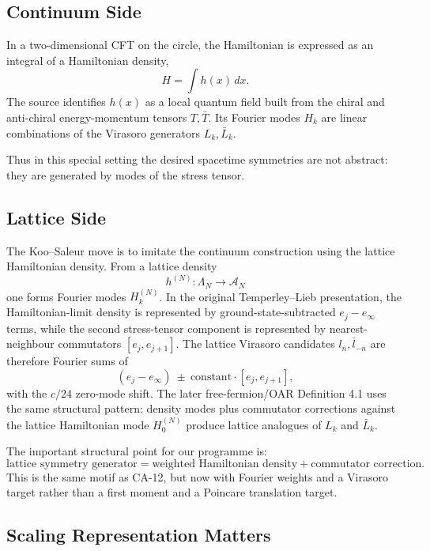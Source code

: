 \subsection{Continuum Side}

In a two-dimensional CFT on the circle, the Hamiltonian is expressed as an
integral of a Hamiltonian density,
\[
  H=\int h(x)\,dx.
\]
The source identifies \(h(x)\) as a local quantum field built from the chiral and
anti-chiral energy-momentum tensors \(T,\bar T\).  Its Fourier modes \(H_k\)
are linear combinations of the Virasoro generators \(L_k,\bar L_k\).

Thus in this special setting the desired spacetime symmetries are not abstract:
they are generated by modes of the stress tensor.

\subsection{Lattice Side}

The Koo--Saleur move is to imitate the continuum construction using the lattice
Hamiltonian density.  From a lattice density
\[
  h^{(N)}:\Lambda_N\to \mathcal A_N
\]
one forms Fourier modes \(H_k^{(N)}\).  In the original Temperley--Lieb
presentation, the Hamiltonian-limit density is represented by
ground-state-subtracted \(e_j-e_\infty\) terms, while the second stress-tensor
component is represented by nearest-neighbour commutators
\([e_j,e_{j+1}]\).  The lattice Virasoro candidates \(l_n,\bar l_{-n}\) are
therefore Fourier sums of
\[
  (e_j-e_\infty)\ \pm\ \text{constant}\cdot [e_j,e_{j+1}],
\]
with the \(c/24\) zero-mode shift.  The later free-fermion/OAR Definition 4.1
uses the same structural pattern: density modes plus commutator corrections
against the lattice Hamiltonian mode \(H_0^{(N)}\) produce lattice analogues of
\(L_k\) and \(\bar L_k\).

The important structural point for our programme is:
\[
  \text{lattice symmetry generator}
  =
  \text{weighted Hamiltonian density}
  +
  \text{commutator correction}.
\]
This is the same motif as CA-12, but now with Fourier weights and a Virasoro
target rather than a first moment and a Poincare translation target.

\subsection{Scaling Representation Matters}

